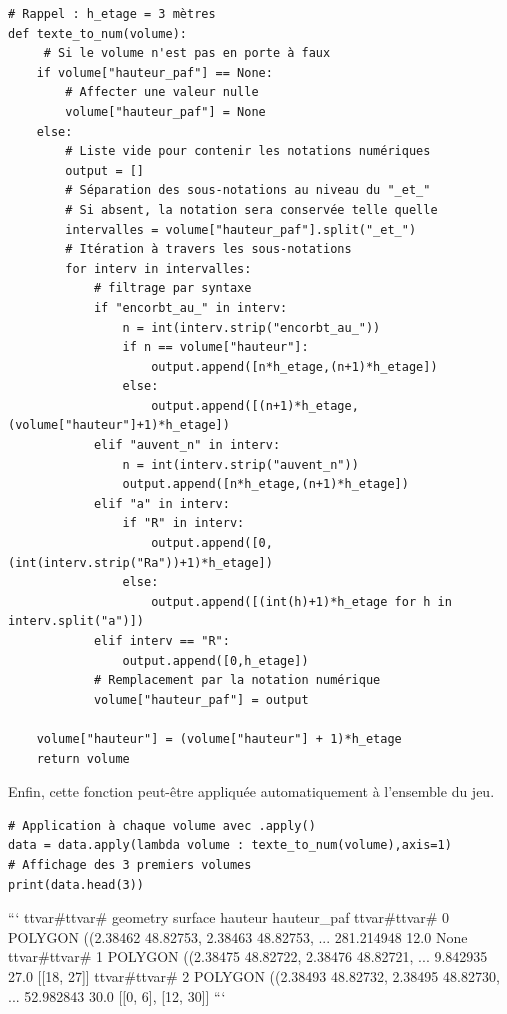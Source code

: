 \documentclass[
  11pt,
  french,
]{article}
\begin{document}
\begin{tcolorbox}[title= Aperçu des différentes notations caractérisant les porte à faux ,colback=boitecode]
\begin{lstlisting}[style=code]
# Rappel : h_etage = 3 mètres
def texte_to_num(volume):
     # Si le volume n'est pas en porte à faux
    if volume["hauteur_paf"] == None:
        # Affecter une valeur nulle
        volume["hauteur_paf"] = None
    else:
        # Liste vide pour contenir les notations numériques
        output = []
        # Séparation des sous-notations au niveau du "_et_"
        # Si absent, la notation sera conservée telle quelle
        intervalles = volume["hauteur_paf"].split("_et_")
        # Itération à travers les sous-notations
        for interv in intervalles:
            # filtrage par syntaxe
            if "encorbt_au_" in interv:
                n = int(interv.strip("encorbt_au_"))
                if n == volume["hauteur"]:
                    output.append([n*h_etage,(n+1)*h_etage])
                else:
                    output.append([(n+1)*h_etage,(volume["hauteur"]+1)*h_etage])
            elif "auvent_n" in interv:
                n = int(interv.strip("auvent_n"))
                output.append([n*h_etage,(n+1)*h_etage])
            elif "a" in interv:
                if "R" in interv:
                    output.append([0,(int(interv.strip("Ra"))+1)*h_etage])
                else:
                    output.append([(int(h)+1)*h_etage for h in interv.split("a")])
            elif interv == "R":
                output.append([0,h_etage])
            # Remplacement par la notation numérique
            volume["hauteur_paf"] = output

    volume["hauteur"] = (volume["hauteur"] + 1)*h_etage
    return volume\end{lstlisting}
\end{tcolorbox}

Enfin, cette fonction peut-être appliquée automatiquement à l'ensemble
du jeu.

\begin{tcolorbox}[title= Aperçu des différentes notations caractérisant les porte à faux ,colback=boitecode]
\begin{lstlisting}[style=code]
# Application à chaque volume avec .apply()
data = data.apply(lambda volume : texte_to_num(volume),axis=1)
# Affichage des 3 premiers volumes
print(data.head(3))\end{lstlisting}

```
ttvar{#}ttvar{#}                                             geometry     surface  hauteur         hauteur_paf
ttvar{#}ttvar{#} 0  POLYGON ((2.38462 48.82753, 2.38463 48.82753, ...  281.214948     12.0                None
ttvar{#}ttvar{#} 1  POLYGON ((2.38475 48.82722, 2.38476 48.82721, ...    9.842935     27.0          [[18, 27]]
ttvar{#}ttvar{#} 2  POLYGON ((2.38493 48.82732, 2.38495 48.82730, ...   52.982843     30.0  [[0, 6], [12, 30]]
```

\end{tcolorbox}
\end{document}
